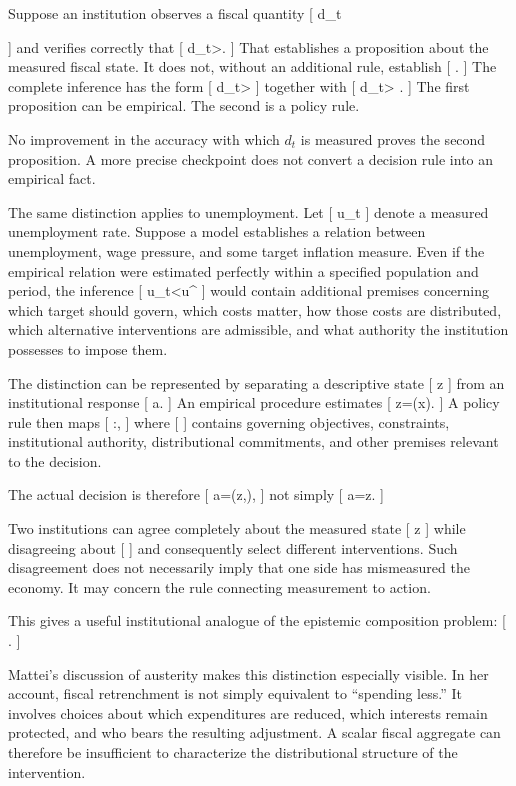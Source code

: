 \documentclass[11pt]{article}
\begin{document}
Suppose an institution observes a fiscal quantity
[
d_t

]
and verifies correctly that
[
d_t>\tau.
]
That establishes a proposition about the measured fiscal state. It does not, without an additional rule, establish
[
.
]
The complete inference has the form
[
d_t>\tau
]
together with
[
d_t>\tau
\Longrightarrow
{}.
]
The first proposition can be empirical. The second is a policy rule.

No improvement in the accuracy with which $d_t$ is measured proves the second proposition. A more precise checkpoint does not convert a decision rule into an empirical fact.

The same distinction applies to unemployment. Let
[
u_t
]
denote a measured unemployment rate. Suppose a model establishes a relation between unemployment, wage pressure, and some target inflation measure. Even if the empirical relation were estimated perfectly within a specified population and period, the inference
[
u_t<u^\star
\Longrightarrow
{}
]
would contain additional premises concerning which target should govern, which costs matter, how those costs are distributed, which alternative interventions are admissible, and what authority the institution possesses to impose them.

The distinction can be represented by separating a descriptive state
[
z\in{}
]
from an institutional response
[
a\in{}.
]
An empirical procedure estimates
[
z=\pi(x).
]
A policy rule then maps
[
\kappa:\times\Gamma\rightarrow{},
]
where
[
\Gamma
]
contains governing objectives, constraints, institutional authority, distributional commitments, and other premises relevant to the decision.

The actual decision is therefore
[
a=\kappa(z,\Gamma),
]
not simply
[
a=z.
]

Two institutions can agree completely about the measured state
[
z
]
while disagreeing about
[
\Gamma
]
and consequently select different interventions. Such disagreement does not necessarily imply that one side has mismeasured the economy. It may concern the rule connecting measurement to action.

This gives a useful institutional analogue of the epistemic composition problem:
[
\quad\not\Rightarrow\quad
{}.
]

Mattei's discussion of austerity makes this distinction especially visible. In her account, fiscal retrenchment is not simply equivalent to ``spending less.'' It involves choices about which expenditures are reduced, which interests remain protected, and who bears the resulting adjustment. A scalar fiscal aggregate can therefore be insufficient to characterize the distributional structure of the intervention.
\end{document}
